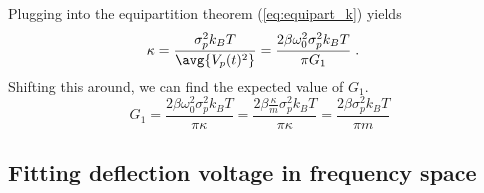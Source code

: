 Plugging into the equipartition theorem (\cref{eq:equipart_k}) yields
\begin{align}
  \kappa &= \frac{\sigma_p^2 k_BT}{\avg{V_p(t)^2}}
    = \frac{2 \beta \omega_0^2 \sigma_p^2 k_BT}{\pi G_1} \;.
\end{align}
Shifting this around, we can find the expected value of $G_1$.
\begin{equation}
  G_1 = \frac{2 \beta \omega_0^2 \sigma_p^2 k_BT}{\pi \kappa}
    = \frac{2 \beta \frac{\kappa}{m} \sigma_p^2 k_BT}{\pi \kappa}
    = \frac{2 \beta \sigma_p^2 k_BT}{\pi m}
    \label{eq:Gone}
\end{equation}

\subsection{Fitting deflection voltage in frequency space}
\label{sec:calibcant:frequency}

